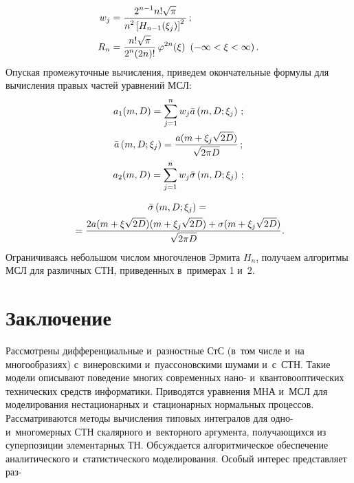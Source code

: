 \begin{multicols}{2}
\noindent
    \begin{align*}
    w_j &= \displaystyle\frac{\displaystyle 2^{n-1} n! \sqrt{\pi}\mathstrut}{\displaystyle n^2 \left[ H_{n-1} (\xi_j)\right]^2\mathstrut}\,;\\
    R_n &= \displaystyle\frac{\displaystyle n! \sqrt{\pi}\mathstrut}{\displaystyle 2^n (2n)!\mathstrut}\, \varphi^{2n} (\xi)\enskip (-\infty<\xi<\infty)\,.
    \end{align*}
Опуская промежуточные вычисления, приведем окончательные формулы для вычисления правых частей уравнений МСЛ:
    \begin{gather*}
    a_1(m,D) =\sum\limits_{j=1}^n w_j \bar a \left( m, D;\xi_j\right)\,;
  \\
    \bar a \left( m, D;\xi_j\right)= \displaystyle\frac{\displaystyle a(m+\xi_j \sqrt{2D})\mathstrut}{\displaystyle \sqrt{2\pi D}\mathstrut}\,;
    \\
    a_2(m,D)=\sum\limits_{j=1}^n w_j \bar{\sigma} \left( m, D;\xi_j\right)\,;
    \end{gather*}

    \vspace*{-12pt}

    \noindent
    \begin{multline*}
    \bar{\sigma} \left( m, D;\xi_j\right)={}\\
    {}=\displaystyle\frac{\displaystyle 2a(m+\xi\sqrt{2D})(m+\xi_j\sqrt{2D}) +\sigma(m+\xi_j\sqrt{2D})\mathstrut}{\displaystyle \sqrt{2\pi D}\mathstrut}.
\end{multline*}
Ограничиваясь небольшом числом многочленов Эрмита $H_n$, получаем алгоритмы МСЛ для различных СТН, приведенных в~примерах 1 и~2.

\vspace*{-6pt}

\section{Заключение}

Рассмотрены  дифференциальные и~разностные СтС (в~том числе и~на многообразиях) с~винеровскими и~пуассоновскими шумами и~с~СТН. Такие модели описывают поведение многих современных нано- и~квантовооптических  технических средств информатики.
Приводятся уравнения МНА и~МСЛ\linebreak
 для моделирования нестационарных и~стационарных нормальных процессов.
Рассматриваются методы вычисления типовых интегралов для одно- и~многомерных  СТН скалярного и~векторного\linebreak
 аргумен\-та, получающихся из суперпозиции элементарных ТН. Обсуждается алгоритмическое обеспечение аналитического и~статистического мо\-делирования.
Особый интерес представляет раз-\linebreak\vspace*{-12pt}


\end{multicols}
